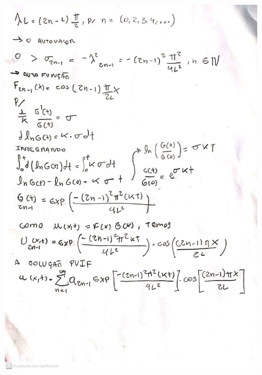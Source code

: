\documentclass[a4paper]{article}
\begin{document}
        \begin{figure}{\textwidth}
            \centering
            \includegraphics[width=\textwidth]{23.jpg}
        \end{figure}

    
\end{document}
